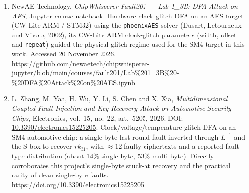 \begin{enumerate}
\item NewAE Technology, \emph{ChipWhisperer Fault201 --- Lab 1\_3B: DFA Attack on AES}, Jupyter course notebook. Hardware clock-glitch DFA on an AES target (CW-Lite ARM / STM32) using the \texttt{phoenixAES} solver (Dusart, Letourneux and Vivolo, 2002); its CW-Lite ARM clock-glitch parameters (width, offset and \texttt{repeat}) guided the physical glitch regime used for the SM4 target in this work. Accessed 20 November 2026.\\
\url{https://github.com/newaetech/chipwhisperer-jupyter/blob/main/courses/fault201/Lab%201_3B%20-%20DFA%20Attack%20on%20AES.ipynb}
\item L. Zhang, M. Yan, H. Wu, Y. Li, S. Chen and X. Xia, \emph{Multidimensional Coupled Fault Injection and Key Recovery Attack on Automotive Security Chips}, Electronics, vol.~15, no.~22, art.~5205, 2026. DOI: \href{https://doi.org/10.3390/electronics15225205}{10.3390/electronics15225205}. Clock/voltage/temperature glitch DFA on an SM4 automotive chip: a single-byte last-round fault inverted through $L^{-1}$ and the S-box to recover $rk_{31}$, with $\approx12$ faulty ciphertexts and a reported fault-type distribution (about 14\% single-byte, 53\% multi-byte). Directly corroborates this project's single-byte stuck-at recovery and the practical rarity of clean single-byte faults.\\
\url{https://doi.org/10.3390/electronics15225205}
\end{enumerate}
